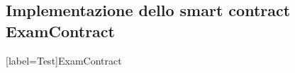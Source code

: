 \begin{appendices}

    \section{Implementazione dello smart contract ExamContract}
    [label=Test]{ExamContract \label{cod:examcontract}}
    \inputminted[linenos]{solidity}{../contracts/contracts/ExamContract.sol}

\end{appendices}